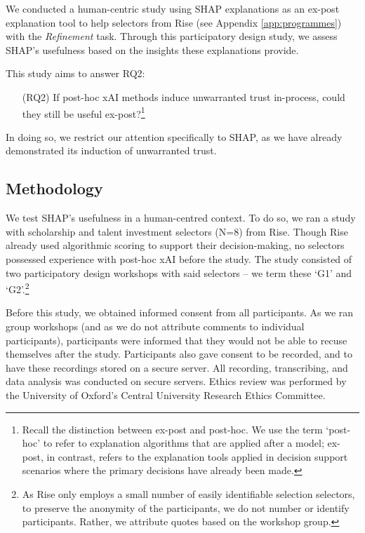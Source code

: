 We conducted a human-centric study using SHAP explanations as an ex-post explanation tool to help selectors from Rise (see Appendix \ref{app:programmes}) with the \emph{Refinement} task. Through this participatory design study, we assess SHAP's usefulness based on the insights these explanations provide.

This study aims to answer RQ2:

\begin{enumerate}
    \item[(RQ2)] If post-hoc xAI methods induce unwarranted trust in-process, could they still be useful ex-post?\footnote{Recall the distinction between ex-post and post-hoc. We use the term `post-hoc' to refer to explanation algorithms that are applied after a model; ex-post, in contrast, refers to the explanation tools applied in decision support scenarios where the primary decisions have already been made.}
\end{enumerate}

\noindent In doing so, we restrict our attention specifically to SHAP, as we have already demonstrated its induction of unwarranted trust.

\subsection{Methodology}\label{ssec:cs_methods}
We test SHAP's usefulness in a human-centred context. To do so, we ran a study with scholarship and talent investment selectors (N=8) from Rise. Though Rise already used algorithmic scoring to support their decision-making, no selectors possessed experience with post-hoc xAI before the study. The study consisted of two participatory design workshops with said selectors – we term these `G1' and `G2'.\footnote{As Rise only employs a small number of easily identifiable selection selectors, to preserve the anonymity of the participants, we do not number or identify participants. Rather, we attribute quotes based on the workshop group.}

Before this study, we obtained informed consent from all participants. As we ran group workshops (and as we do not attribute comments to individual participants), participants were informed that they would not be able to recuse themselves after the study. Participants also gave consent to be recorded, and to have these recordings stored on a secure server. All recording, transcribing, and data analysis was conducted on secure servers. Ethics review was performed by the University of Oxford's Central University Research Ethics Committee.

